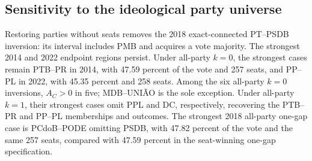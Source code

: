 \documentclass[11pt]{article}
\begin{document}

\newpage
\subsection{Sensitivity to the ideological party universe}
\label{app:ideological-universes}

Restoring parties without seats removes the 2018 exact-connected PT--PSDB
inversion: its interval includes PMB and acquires a vote majority. The strongest
2014 and 2022 endpoint regions persist. Under all-party \(k=0\), the strongest
cases remain PTB--PR in 2014, with 47.59 percent of the vote and 257 seats, and
PP--PL in 2022, with 45.35 percent and 258 seats. Among the six all-party
\(k=0\) inversions, \(A_C>0\) in five; MDB--UNIÃO is the sole exception.
Under all-party \(k=1\), their strongest
cases omit PPL and DC, respectively, recovering the  PTB--PR and PP--PL
memberships and outcomes. The strongest 2018 all-party one-gap case is
PCdoB--PODE omitting PSDB, with 47.82 percent of the vote and the same 257 seats,
compared with 47.59 percent in the seat-winning one-gap specification.
\end{document}
